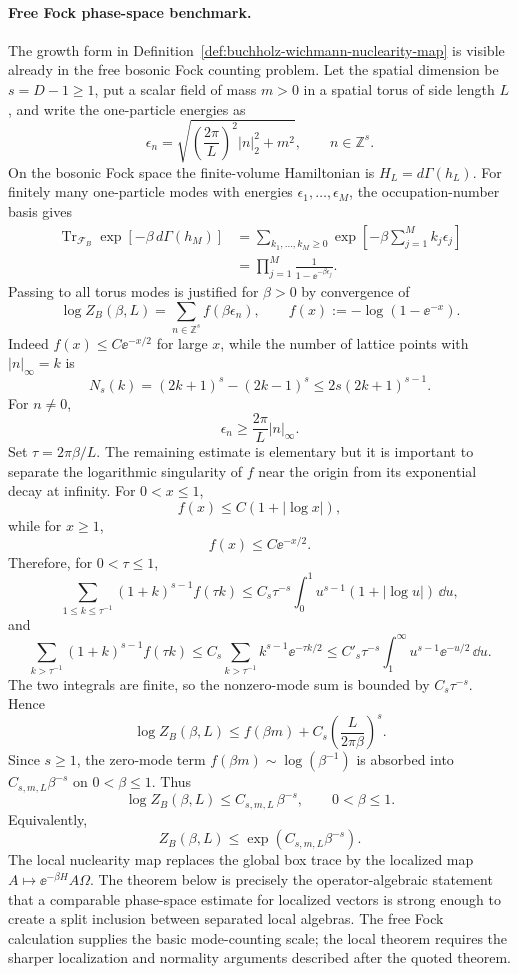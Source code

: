 \paragraph{Free Fock phase-space benchmark.}
The growth form in Definition~\ref{def:buchholz-wichmann-nuclearity-map} is
visible already in the free bosonic Fock counting problem.  Let the spatial
dimension be \(s=D-1\ge1\), put a scalar field of mass \(m>0\) in a spatial
torus of side length \(L\), and write the one-particle energies as
\[
  \epsilon_n
  =
  \sqrt{\left(\frac{2\pi}{L}\right)^2|n|_2^2+m^2},
  \qquad
  n\in\mathbb Z^s .
\]
On the bosonic Fock space the finite-volume Hamiltonian is
\(H_L=d\Gamma(h_L)\).  For finitely many one-particle modes with energies
\(\epsilon_1,\ldots,\epsilon_M\), the occupation-number basis gives
\[
\begin{aligned}
  \operatorname{Tr}_{\mathcal F_B}
  \exp\!\left[-\beta\,d\Gamma(h_M)\right]
  &=
  \sum_{k_1,\ldots,k_M\ge0}
  \exp\!\left[-\beta\sum_{j=1}^M k_j\epsilon_j\right]  \\
  &=
  \prod_{j=1}^M
  \frac{1}{1-\ee^{-\beta\epsilon_j}} .
\end{aligned}
\]
Passing to all torus modes is justified for \(\beta>0\) by convergence of
\[
  \log Z_B(\beta,L)
  =
  \sum_{n\in\mathbb Z^s}
  f(\beta\epsilon_n),
  \qquad
  f(x):=-\log(1-\ee^{-x}) .
\]
Indeed \(f(x)\le C\ee^{-x/2}\) for large \(x\), while the number of lattice
points with \(|n|_\infty=k\) is
\[
  N_s(k)=(2k+1)^s-(2k-1)^s
  \le 2s(2k+1)^{s-1}.
\]
For \(n\ne0\),
\[
  \epsilon_n\ge \frac{2\pi}{L}|n|_\infty .
\]
Set \(\tau=2\pi\beta/L\).  The remaining estimate is elementary but it is
important to separate the logarithmic singularity of \(f\) near the origin
from its exponential decay at infinity.  For \(0<x\le1\),
\[
  f(x)\le C(1+|\log x|),
\]
while for \(x\ge1\),
\[
  f(x)\le C\ee^{-x/2}.
\]
Therefore, for \(0<\tau\le1\),
\[
  \sum_{1\le k\le \tau^{-1}}(1+k)^{s-1}f(\tau k)
  \le
  C_s \tau^{-s}
  \int_0^1 u^{s-1}(1+|\log u|)\,\dd u ,
\]
and
\[
  \sum_{k> \tau^{-1}}(1+k)^{s-1}f(\tau k)
  \le
  C_s\sum_{k>\tau^{-1}} k^{s-1}\ee^{-\tau k/2}
  \le
  C'_s\tau^{-s}\int_1^\infty u^{s-1}\ee^{-u/2}\,\dd u .
\]
The two integrals are finite, so the nonzero-mode sum is bounded by
\(C_s\tau^{-s}\).  Hence
\[
  \log Z_B(\beta,L)
  \le
  f(\beta m)
  +
  C_s\left(\frac{L}{2\pi\beta}\right)^s .
\]
Since \(s\ge1\), the zero-mode term \(f(\beta m)\sim\log(\beta^{-1})\) is
absorbed into \(C_{s,m,L}\beta^{-s}\) on \(0<\beta\le1\).  Thus
\begin{equation}
  \log Z_B(\beta,L)
  \le
  C_{s,m,L}\,\beta^{-s},
  \qquad 0<\beta\le1 .
  \label{eq:free-fock-phase-space-growth}
\end{equation}
Equivalently,
\[
  Z_B(\beta,L)
  \le
  \exp(C_{s,m,L}\beta^{-s}) .
\]
The local nuclearity map replaces the global box trace by the localized map
\(A\mapsto \ee^{-\beta H}A\Omega\).  The theorem below is precisely the
operator-algebraic statement that a comparable phase-space estimate for
localized vectors is strong enough to create a split inclusion between
separated local algebras.  The free Fock calculation supplies the basic
mode-counting scale; the local theorem requires the sharper localization and
normality arguments described after the quoted theorem.

